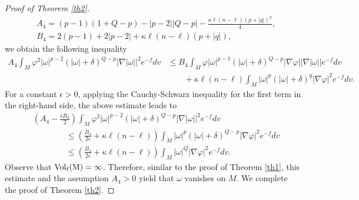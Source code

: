 \documentclass[leqno,12pt]{article} %
\theoremstyle{plain} %
\theoremstyle{definition} %
\numberwithin{equation}{section}
\begin{document}
\begin{proof}[Proof of Theorem \ref{th2}]
	\begin{align*}
		&A_4=(p-1)(1+Q-p)-|p-2||Q-p|-\frac{\kappa \ell (n-\ell)(p+|q|)^2}{4},\\
		&B_4=2(p-1)+2|p-2|+\kappa \ell (n-\ell)(p+|q|),
	\end{align*}
	we obtain the following inequality
	\begin{align*}\nonumber
		A_4 \int_M \varphi^2 |\omega|^{p-2} (|\omega|+\delta)^{Q-p}|\nabla|\omega||^2 e^{-f}dv & \le B_4 \int_M \varphi |\omega|^{p-1} (|\omega|+\delta)^{Q-p}|\nabla \varphi||\nabla|\omega||e^{-f}dv\\
		&\qquad +\kappa \ell (n-\ell)\int_M |\omega|^p (|\omega|+\delta)^q |\nabla \varphi|^2 e^{-f}dv.
	\end{align*}
	For a constant $\epsilon>0$, applying the Cauchy-Schwarz inequality for the first term in the right-hand side, the above estimate leads to
	\begin{align}\nonumber
		&\left(A_4-\frac{\epsilon B_4}{2}\right) \int_M \varphi^2 |\omega|^{p-2}(|\omega|+\delta)^{Q-p}|\nabla|\omega||^2 e^{-f}dv \\ \nonumber
		&\qquad\qquad\le \left( \frac{B_4}{2\epsilon}+\kappa \ell (n-\ell) \right)\int_M |\omega|^{p} (|\omega|+\delta)^{Q-p}|\nabla \varphi|^2e^{-f}dv\\ \nonumber
		&\qquad\qquad\le \left( \frac{B_4}{2\epsilon}+\kappa \ell (n-\ell) \right) \int_M |\omega|^{Q} |\nabla \varphi|^2e^{-f}dv.
	\end{align}
	Observe that  $\rm{Vol}_f(M)=\infty$. Therefore, similar to the proof of Theorem \ref{th1}, this estimate and the assumption $A_4>0$ yield that $\omega$ vanishes on $M$. We complete the proof of Theorem \ref{th2}.
\end{proof}
	
\end{document}
